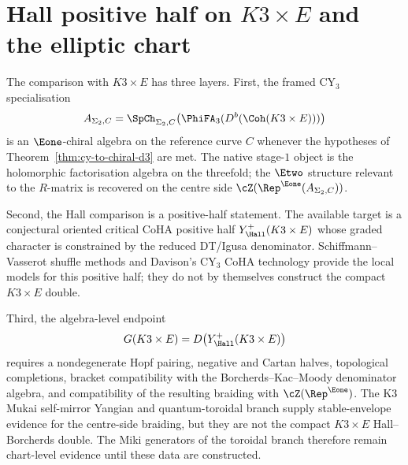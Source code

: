 \section{Hall positive half on \texorpdfstring{$K3 \times E$}{K3 x E} and the elliptic chart}
\label{sec:tor-ell-k3-lift}

\begin{remark}
\label{rem:tor-ell-k3-lift-opener}
The comparison with $K3\times E$ has three layers. First, the framed
CY$_3$ specialisation
\[
A_{\Sigma_2,C}
=\SpCh_{\Sigma_2,C}\bigl(\PhiFA_3(D^b(\Coh(K3\times E)))\bigr)
\]
is an $\Eone$-chiral algebra on the reference curve $C$ whenever the
hypotheses of Theorem~\ref{thm:cy-to-chiral-d3} are met. The native
stage-$1$ object is the holomorphic factorisation algebra on the
threefold; the $\Etwo$ structure relevant to the $R$-matrix is recovered
on the centre side $\cZ(\Rep^{\Eone}(A_{\Sigma_2,C}))$.

Second, the Hall comparison is a positive-half statement. The available
target is a conjectural oriented critical CoHA positive half
$Y^+_{\Hall}(K3\times E)$ whose graded character is constrained by the
reduced DT/Igusa denominator. Schiffmann--Vasserot shuffle methods and
Davison's CY$_3$ CoHA technology provide the local models for this
positive half; they do not by themselves construct the compact
$K3\times E$ double.

Third, the algebra-level endpoint
\[
G(K3\times E)=D\bigl(Y^+_{\Hall}(K3\times E)\bigr)
\]
requires a nondegenerate Hopf pairing, negative and Cartan halves,
topological completions, bracket compatibility with the
Borcherds--Kac--Moody denominator algebra, and compatibility of the
resulting braiding with $\cZ(\Rep^{\Eone})$. The K3 Mukai
self-mirror Yangian and quantum-toroidal branch supply stable-envelope
evidence for the centre-side braiding, but they are not the compact
$K3\times E$ Hall--Borcherds double. The Miki generators of the
toroidal branch therefore remain chart-level evidence until these data
are constructed.
\end{remark}
